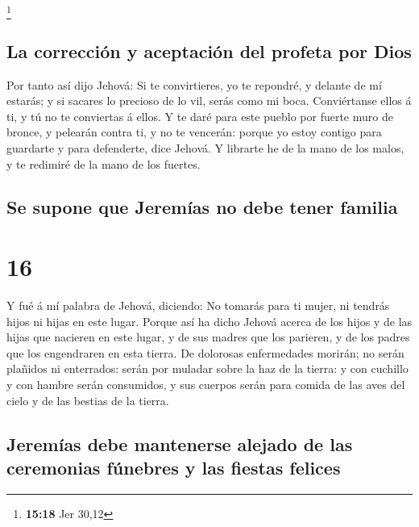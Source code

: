 \footnote{\textbf{15:18} Jer 30,12}

\hypertarget{la-correcciuxf3n-y-aceptaciuxf3n-del-profeta-por-dios}{%
\subsection{La corrección y aceptación del profeta por
Dios}\label{la-correcciuxf3n-y-aceptaciuxf3n-del-profeta-por-dios}}

 Por tanto así dijo Jehová: Si te convirtieres, yo te
repondré, y delante de mí estarás; y si sacares lo precioso de lo vil,
serás como mi boca. Conviértanse ellos á ti, y tú no te conviertas á
ellos.  Y te daré para este pueblo por fuerte muro de
bronce, y pelearán contra ti, y no te vencerán: porque yo estoy contigo
para guardarte y para defenderte, dice Jehová.  Y librarte
he de la mano de los malos, y te redimiré de la mano de los fuertes.

\hypertarget{se-supone-que-jeremuxedas-no-debe-tener-familia}{%
\subsection{Se supone que Jeremías no debe tener
familia}\label{se-supone-que-jeremuxedas-no-debe-tener-familia}}

\hypertarget{section-15}{%
\section{16}\label{section-15}}

 Y fué á mí palabra de Jehová, diciendo:  No
tomarás para ti mujer, ni tendrás hijos ni hijas en este lugar.
 Porque así ha dicho Jehová acerca de los hijos y de las
hijas que nacieren en este lugar, y de sus madres que los parieren, y de
los padres que los engendraren en esta tierra.  De dolorosas
enfermedades morirán; no serán plañidos ni enterrados: serán por muladar
sobre la haz de la tierra: y con cuchillo y con hambre serán consumidos,
y sus cuerpos serán para comida de las aves del cielo y de las bestias
de la tierra.

\hypertarget{jeremuxedas-debe-mantenerse-alejado-de-las-ceremonias-fuxfanebres-y-las-fiestas-felices}{%
\subsection{Jeremías debe mantenerse alejado de las ceremonias fúnebres
y las fiestas
felices}\label{jeremuxedas-debe-mantenerse-alejado-de-las-ceremonias-fuxfanebres-y-las-fiestas-felices}}


